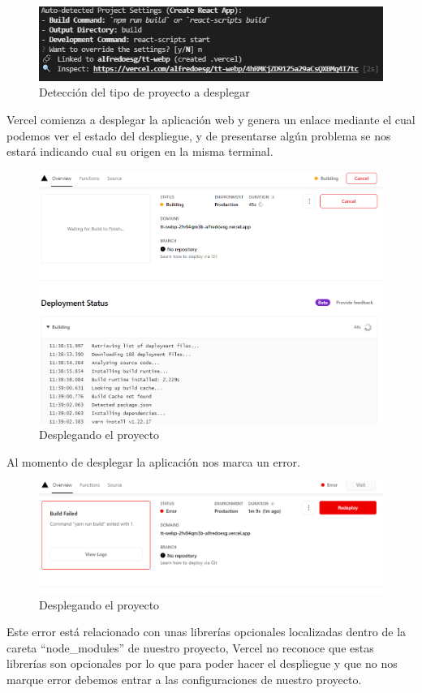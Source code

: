 \documentclass[12pt, a4paper, titlepage]{article}
\begin{document}
	\begin{figure}[H]
		\includegraphics[width=12cm]{./Imagenes/Despliegue/Deteccion.png}
		\centering 
		\caption{Detección del tipo de proyecto a desplegar}
	\end{figure}
	Vercel comienza a desplegar la aplicación web y genera un enlace mediante el cual podemos ver el estado del despliegue, y de presentarse algún problema se nos estará indicando cual su origen en la misma terminal.
	\begin{figure}[H]
		\includegraphics[width=12cm]{./Imagenes/Despliegue/Desplegando.png}
		\centering 
		\caption{Desplegando el proyecto}
	\end{figure}
	Al momento de desplegar la aplicación nos marca un error.
	\begin{figure}[H]
		\includegraphics[width=12cm]{./Imagenes/Despliegue/Error.png}
		\centering 
		\caption{Desplegando el proyecto}
	\end{figure}
	Este error está relacionado con unas librerías opcionales localizadas dentro de la careta “node\_modules” de nuestro proyecto, Vercel no reconoce que estas librerías son opcionales por lo que para poder hacer el despliegue y que no nos marque error debemos entrar a las configuraciones de nuestro proyecto.	
\end{document}
